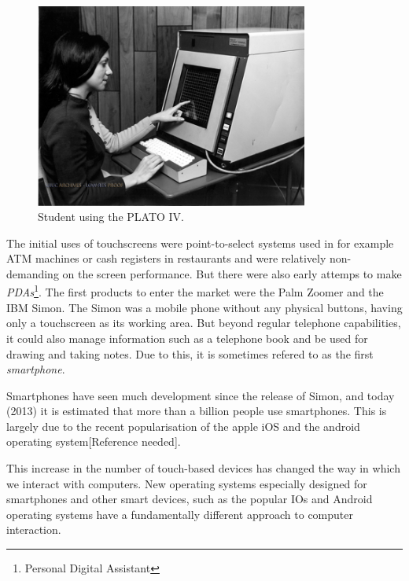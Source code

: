 \begin{figure}[]
\includegraphics[width=0.8\textwidth] {bilder/platoiv.jpg}
\caption{Student using the PLATO IV.}
\label{platoIV}
\end{figure}
\nocite{platoiv}


The initial uses of touchscreens were point-to-select systems used in for example ATM machines or cash registers in restaurants and were relatively non-demanding on the screen performance\cite{buxton}. But there were also early attemps to make \emph{PDAs}\footnote{Personal Digital Assistant}. The first products to enter the market were the Palm Zoomer and the IBM Simon. The Simon was a mobile phone without any physical buttons, having only a touchscreen as its working area. But beyond regular telephone capabilities, it could also manage information such as a telephone book and be used for drawing and taking notes. Due to this, it is sometimes refered to as the first \emph{smartphone}\cite{buxton}.

Smartphones have seen much development since the release of Simon, and today (2013) it is estimated that more than a billion people use smartphones\cite{billion1}\cite{billion2}. This is largely due to the recent popularisation of the apple iOS and the android operating system[Reference needed]. 

This increase in the number of touch-based devices has changed the way in which we interact with computers. New operating systems especially designed for smartphones and other smart devices, such as the popular IOs and Android operating systems have a fundamentally different approach to computer interaction.

